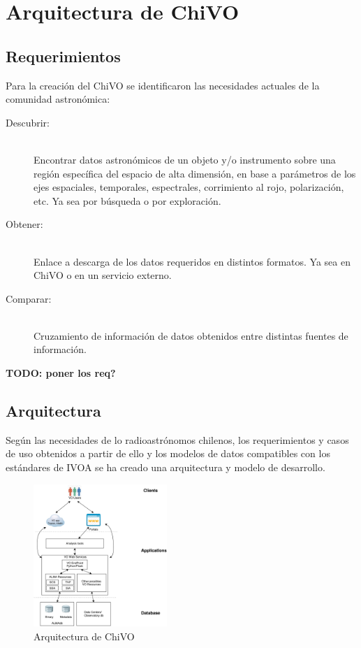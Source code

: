 \section{Arquitectura de ChiVO}

\subsection{Requerimientos}

Para la creación del ChiVO se identificaron las necesidades actuales de la comunidad
astronómica:

\begin{description}
    \item[Descubrir:] \hfill \\
        Encontrar datos astronómicos de un objeto y/o instrumento sobre una región
        específica del espacio de alta dimensión, en base a parámetros de los ejes
        espaciales, temporales, espectrales, corrimiento al rojo, polarización, etc.
        Ya sea por búsqueda o por exploración.
    \item[Obtener:] \hfill \\
        Enlace a descarga de los datos requeridos en distintos formatos.
        Ya sea en ChiVO o en un servicio externo.
    \item[Comparar:] \hfill \\
        Cruzamiento de información de datos obtenidos entre distintas fuentes de
        información.
\end{description}

\textbf{TODO: poner los req?}

\subsection{Arquitectura}

Según las necesidades de lo radioastrónomos chilenos, los requerimientos y casos de
uso obtenidos a partir de ello y los modelos de datos compatibles con los estándares
de IVOA se ha creado una arquitectura y modelo de desarrollo.

\begin{figure}[h]
    \centering
    \includegraphics[width=0.45\textwidth]{images/chivo_capas.png}
    \caption{Arquitectura de ChiVO}
    \label{fig:chivoarch}
\end{figure}

